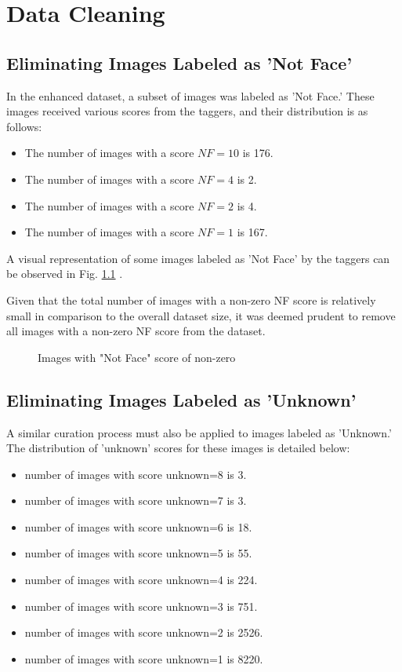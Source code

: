 \documentclass[]{report}
\begin{document}
\chapter{Data Cleaning}
\section{Eliminating Images Labeled as 'Not Face'}

In the enhanced dataset, a subset of images was labeled as 'Not Face.' These images received various scores from the taggers, and their distribution is as follows:

\begin{itemize}
	\item The number of images with a score $NF=10$ is 176.
	\item The number of images with a score $NF=4$ is 2.
	\item The number of images with a score $NF=2$ is 4.
	\item The number of images with a score $NF=1$ is 167.
\end{itemize}

A visual representation of some images labeled as 'Not Face' by the taggers can be observed in Fig. \ref{fig:nf} .

Given that the total number of images with a non-zero NF score is relatively small in comparison to the overall dataset size, it was deemed prudent to remove all images with a non-zero NF score from the dataset.

\begin{figure}[h]
	\centering
	\subfloat[Images with NF=10]{{ }}
	\qquad
	\subfloat[Images with NF=2]{{ }}
	\caption{Images with "Not Face" score of non-zero}
	\label{fig:nf}
\end{figure}
\section{Eliminating Images Labeled as 'Unknown'}
A similar curation process must also be applied to images labeled as 'Unknown.' The distribution of 'unknown' scores for these images is detailed below:
\begin{itemize}
	\item number of images with score unknown=8 is  3.
	\item number of images with score unknown=7 is  3.
	\item number of images with score unknown=6 is  18.
	\item number of images with score unknown=5 is  55.
	\item number of images with score unknown=4 is  224.
	\item number of images with score unknown=3 is  751.
	\item number of images with score unknown=2 is  2526.
	\item number of images with score unknown=1 is  8220.
\end{itemize}
\end{document}
